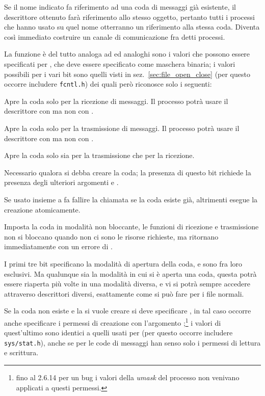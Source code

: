 Se il nome indicato fa riferimento ad una coda di messaggi già esistente, il
descrittore ottenuto farà riferimento allo stesso oggetto, pertanto tutti i
processi che hanno usato  su quel nome otterranno un
riferimento alla stessa coda. Diventa così immediato costruire un canale di
comunicazione fra detti processi.

La funzione è del tutto analoga ad  ed analoghi sono i valori che
possono essere specificati per , che deve essere specificato come
maschera binaria; i valori possibili per i vari bit sono quelli visti in
sez.~\ref{sec:file_open_close} (per questo occorre includere \texttt{fcntl.h})
dei quali però  riconosce solo i seguenti:
\begin{basedescript}{\desclabelwidth{2.2cm}\desclabelstyle{\nextlinelabel}}
\item[\const{O\_RDONLY}] Apre la coda solo per la ricezione di messaggi. Il
  processo potrà usare il descrittore con  ma non con
  .
\item[\const{O\_WRONLY}] Apre la coda solo per la trasmissione di messaggi. Il
  processo potrà usare il descrittore con  ma non con
  .
\item[\const{O\_RDWR}] Apre la coda solo sia per la trasmissione che per la
  ricezione. 
\item[\const{O\_CREAT}] Necessario qualora si debba creare la coda; la
  presenza di questo bit richiede la presenza degli ulteriori argomenti
   e .
\item[\const{O\_EXCL}] Se usato insieme a  fa fallire la
  chiamata se la coda esiste già, altrimenti esegue la creazione atomicamente.
\item[\const{O\_NONBLOCK}] Imposta la coda in modalità non bloccante, le
  funzioni di ricezione e trasmissione non si bloccano quando non ci sono le
  risorse richieste, ma ritornano immediatamente con un errore di
  .
\end{basedescript}

I primi tre bit specificano la modalità di apertura della coda, e sono fra
loro esclusivi. Ma qualunque sia la modalità in cui si è aperta una coda,
questa potrà essere riaperta più volte in una modalità diversa, e vi si potrà
sempre accedere attraverso descrittori diversi, esattamente come si può fare
per i file normali.

Se la coda non esiste e la si vuole creare si deve specificare
, in tal caso occorre anche specificare i permessi di
creazione con l'argomento ;\footnote{fino al 2.6.14 per un bug i
  valori della \textit{umask} del processo non venivano applicati a questi
  permessi.} i valori di quest'ultimo sono identici a quelli usati per
 (per questo occorre includere \texttt{sys/stat.h}), anche se per
le code di messaggi han senso solo i permessi di lettura e scrittura.

